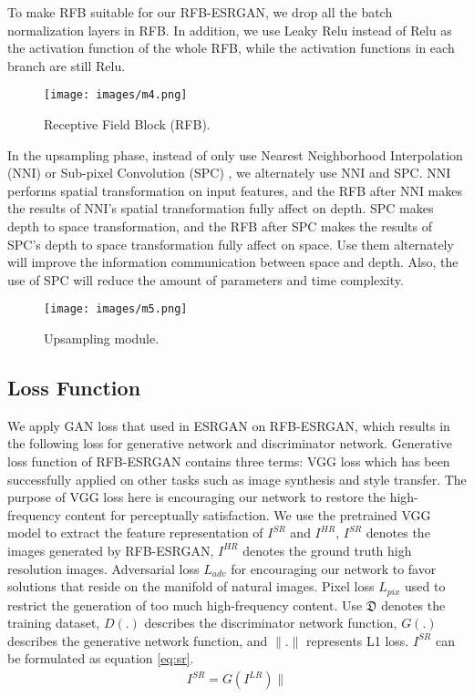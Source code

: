 \documentclass[10pt,twocolumn,letterpaper]{article}
\begin{document}
To make RFB suitable for our RFB-ESRGAN, we drop all the batch normalization layers in RFB. In addition, we use Leaky Relu instead of Relu as the activation function of the whole RFB, while the activation functions in each branch are still Relu.




\begin{figure}[htbp]
\centering 
\texttt{[image: images/m4.png]}
\caption{Receptive Field Block (RFB).}
\label{fig:RFB}
\end{figure}


In the upsampling phase, instead of only use Nearest Neighborhood Interpolation (NNI) or Sub-pixel Convolution (SPC) \cite{shi2016real}, we alternately use NNI and SPC. NNI performs spatial transformation on input features, and the RFB after NNI makes the results of NNI's spatial transformation fully affect on depth. SPC makes depth to space transformation, and the RFB after SPC makes the results of SPC's depth to space transformation fully affect on space. Use them alternately will improve the information communication between space and depth. Also, the use of SPC will reduce the amount of parameters and time complexity.

\begin{figure}[htbp]
\centering 
\texttt{[image: images/m5.png]}
\caption{Upsampling module.}
\label{fig:upsampling}
\end{figure}

\subsection{Loss Function} \label{sec:loss}
We apply GAN loss that used in ESRGAN \cite{wang2018esrgan} on RFB-ESRGAN, which results in the following loss for generative network and discriminator network. Generative loss function of RFB-ESRGAN contains three terms:  VGG loss which has been successfully applied on other tasks such as image synthesis and style transfer. The purpose of VGG loss here is encouraging our network to restore the high-frequency content for perceptually satisfaction. We use the pretrained VGG model to extract the feature representation of $I^{SR}$ and $I^{HR}$, $I^{SR}$ denotes the images generated by RFB-ESRGAN,  $I^{HR}$ denotes the ground truth high resolution images. Adversarial loss $L_{adv}$ for encouraging our network to favor solutions that reside on the manifold of natural images. Pixel loss $L_{pix}$ used to restrict the generation of too much high-frequency content. Use $\mathfrak D$ denotes the training dataset, $D(.)$ describes the discriminator network function, $G(.)$ describes the generative network function, and $\|.\|$ represents L1 loss. $I^{SR}$ can be formulated as equation \eqref{eq:sr}.
\begin{equation} \label{eq:sr}
\begin{split}
I^{SR}=G(I^{LR})\|
\end{split}
\end{equation}
\end{document}
